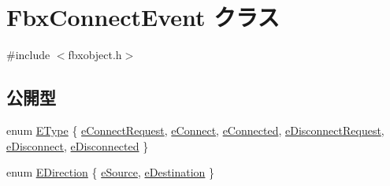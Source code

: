 \hypertarget{class_fbx_connect_event}{}\section{Fbx\+Connect\+Event クラス}
\label{class_fbx_connect_event}


{\ttfamily \#include $<$fbxobject.\+h$>$}

\subsection*{公開型}
\begin{DoxyCompactItemize}
\item 
enum \hyperlink{class_fbx_connect_event_aa5471711f7e440a5a236ed06b08bf1d7}{E\+Type} \{ \newline
\hyperlink{class_fbx_connect_event_aa5471711f7e440a5a236ed06b08bf1d7a144cb4102f3fd76e7f324240b18cba8a}{e\+Connect\+Request}, 
\hyperlink{class_fbx_connect_event_aa5471711f7e440a5a236ed06b08bf1d7acd82d767509255416693a2b063a9d59d}{e\+Connect}, 
\hyperlink{class_fbx_connect_event_aa5471711f7e440a5a236ed06b08bf1d7ad2f3bb192e24a771571f7c016417c688}{e\+Connected}, 
\hyperlink{class_fbx_connect_event_aa5471711f7e440a5a236ed06b08bf1d7a4a75bc1cc9c205407c32362ab967013e}{e\+Disconnect\+Request}, 
\newline
\hyperlink{class_fbx_connect_event_aa5471711f7e440a5a236ed06b08bf1d7a7a082d8de322ba2a2c2a259654fa289a}{e\+Disconnect}, 
\hyperlink{class_fbx_connect_event_aa5471711f7e440a5a236ed06b08bf1d7ae582052f26e73efaee7abc1c478aecfa}{e\+Disconnected}
 \}
\item 
enum \hyperlink{class_fbx_connect_event_a74f6cfad7f026059654d3bc6a582a78e}{E\+Direction} \{ \hyperlink{class_fbx_connect_event_a74f6cfad7f026059654d3bc6a582a78eae55732b08fd300f380e085aaf7353301}{e\+Source}, 
\hyperlink{class_fbx_connect_event_a74f6cfad7f026059654d3bc6a582a78ea038e0f3bc26caaae3b76ce45d1e8aba9}{e\+Destination}
 \}
\end{DoxyCompactItemize}
